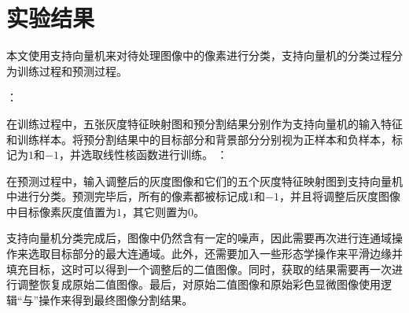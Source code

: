 \section{实验结果}
本文使用支持向量机来对待处理图像中的像素进行分类，支持向量机的分类过程分为训练过程和预测过程。
\begin{enumerate}
：

    在训练过程中，五张灰度特征映射图和预分割结果分别作为支持向量机的输入特征和训练样本。将预分割结果中的目标部分和背景部分分别视为正样本和负样本，标记为$1$和$-1$，并选取线性核函数进行训练。
：

    在预测过程中，输入调整后的灰度图像和它们的五个灰度特征映射图到支持向量机中进行分类。预测完毕后，所有的像素都被标记成$1$和$-1$，并且将调整后灰度图像中目标像素灰度值置为$1$，其它则置为$0$。
\end{enumerate}

支持向量机分类完成后，图像中仍然含有一定的噪声，因此需要再次进行连通域操作来选取目标部分的最大连通域。此外，还需要加入一些形态学操作来平滑边缘并填充目标，这时可以得到一个调整后的二值图像。同时，获取的结果需要再一次进行调整恢复成原始二值图像。最后，对原始二值图像和原始彩色显微图像使用逻辑“与”操作来得到最终图像分割结果。

